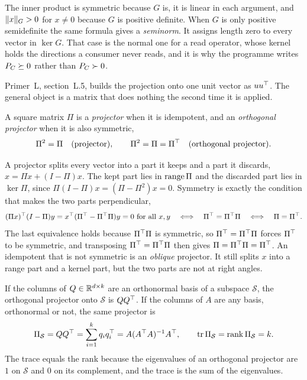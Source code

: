The inner product is symmetric because $G$ is, it is linear in each argument,
and $\lVert x\rVert_G>0$ for $x\neq 0$ because $G$ is positive definite. When $G$ is
only positive semidefinite the same formula gives a \emph{seminorm}. It assigns
length zero to every vector in $\ker G$. That case is the normal one for a read
operator, whose kernel holds the directions a consumer never reads, and it is
why the programme writes $P_C\succeq 0$ rather than $P_C\succ 0$.

Primer~L, section~L.5, builds the projection onto one unit vector as $uu^{\top}$. The
general object is a matrix that does nothing the second time it is applied.

\begin{definition}[Projector]\label{def:ch01:projector}
A square matrix $\Pi$ is a \emph{projector} when it is idempotent, and an
\emph{orthogonal projector} when it is also symmetric,
\begin{equation}\label{eq:ch01:projector}
\Pi^2=\Pi \quad\text{(projector)},\qquad \Pi^2=\Pi=\Pi^{\top}\quad\text{(orthogonal projector)}.
\end{equation}
\end{definition}

A projector splits every vector into a part it keeps and a part it discards,
$x=\Pi x+(I-\Pi)x$. The kept part lies in $\operatorname{range}\Pi$ and the discarded part
lies in $\ker\Pi$, since $\Pi(I-\Pi)x=(\Pi-\Pi^2)x=0$. Symmetry is exactly the
condition that makes the two parts perpendicular,
\begin{equation}\label{eq:ch01:split}
(\Pi x)^{\top}(I-\Pi)y = x^{\top}(\Pi^{\top}-\Pi^{\top}\Pi)y = 0\ \text{for all }x,y
\quad\Longleftrightarrow\quad \Pi^{\top}=\Pi^{\top}\Pi \quad\Longleftrightarrow\quad \Pi=\Pi^{\top} .
\end{equation}
The last equivalence holds because $\Pi^{\top}\Pi$ is symmetric, so $\Pi^{\top}=\Pi^{\top}\Pi$
forces $\Pi^{\top}$ to be symmetric, and transposing $\Pi^{\top}=\Pi^{\top}\Pi$ then gives
$\Pi=\Pi^{\top}\Pi=\Pi^{\top}$. An idempotent that is not symmetric is an \emph{oblique}
projector. It still splits $x$ into a range part and a kernel part, but the two
parts are not at right angles.

If the columns of $Q\in\mathbb{R}^{d\times k}$ are an orthonormal basis of a subspace
$\mathcal S$, the orthogonal projector onto $\mathcal S$ is $QQ^{\top}$. If the
columns of $A$ are any basis, orthonormal or not, the same projector is
\begin{equation}\label{eq:ch01:projbasis}
\Pi_{\mathcal S}=QQ^{\top}=\sum_{i=1}^k q_iq_i^{\top} = A(A^{\top} A)^{-1}A^{\top},\qquad
\operatorname{tr}\Pi_{\mathcal S}=\operatorname{rank}\Pi_{\mathcal S}=k .
\end{equation}
The trace equals the rank because the eigenvalues of an orthogonal projector
are $1$ on $\mathcal S$ and $0$ on its complement, and the trace is the sum of
the eigenvalues.

